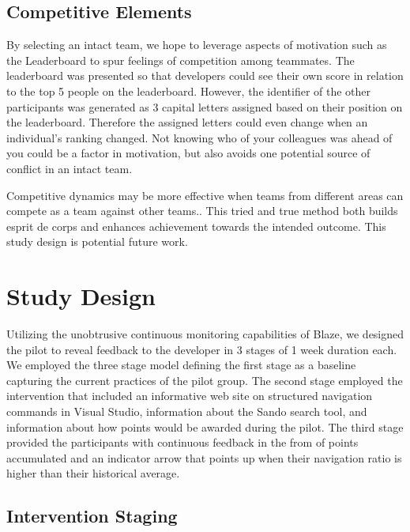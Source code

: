 \documentclass{sig-alternate}
\begin{document}
\subsection{Competitive Elements}
By selecting an intact team, we hope to leverage aspects of motivation such as the Leaderboard to spur feelings of competition among teammates.    The leaderboard was presented so that developers could see their own score in relation to the top 5 people on the leaderboard.  However, the identifier of the other participants was generated as 3 capital letters assigned based on their position on the leaderboard.  Therefore the assigned letters could even change when an individual's ranking changed.  Not knowing who of your colleagues was ahead of you could be a factor in motivation, but also avoids one potential source of conflict in an intact team.

Competitive dynamics may be more effective when teams from different areas can compete as a team against other teams..  This tried and true method both builds esprit de corps and enhances achievement towards the intended outcome.  This study design is potential future work. 

\section {Study Design}

Utilizing the unobtrusive continuous monitoring capabilities of Blaze, we designed the pilot to reveal feedback to the developer in 3 stages of 1 week duration each.
We employed the three stage model defining the first stage as a baseline capturing the current practices of the pilot group.  The second stage employed the intervention that included an informative web site on structured navigation commands in Visual Studio, information about the Sando search tool, and information about how points would be awarded during the pilot.  The third stage provided the participants with continuous feedback in the from of points accumulated and an indicator arrow that points up when their navigation ratio is higher than their historical average.  

\subsection{Intervention Staging}
\end{document}
